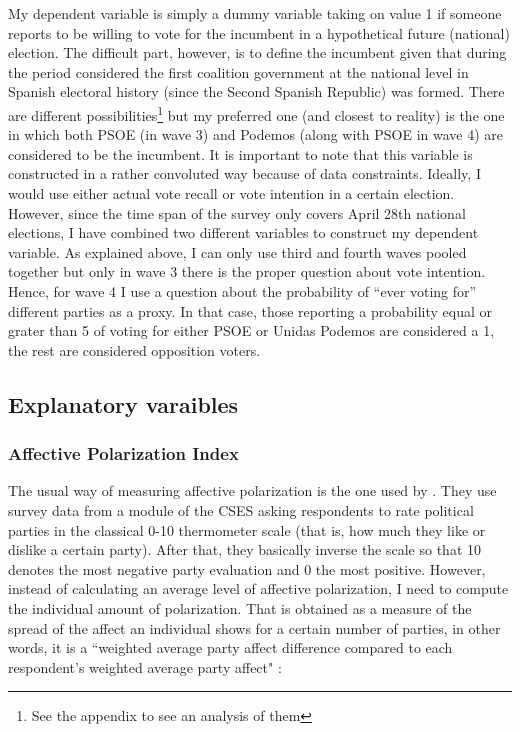 \documentclass[a4paper, svgnames]{article}
\begin{document}
My dependent variable is simply a dummy variable taking on value 1 if someone reports to be willing to vote for the incumbent in a hypothetical future (national) election. The difficult part, however, is to define the incumbent given that during the period considered the first coalition government at the national level in Spanish electoral history (since the Second Spanish Republic) was formed. There are different possibilities\footnote{See the appendix to see an analysis of them} but my preferred one (and closest to reality) is the one in which both PSOE (in wave 3) and Podemos (along with PSOE in wave 4) are considered to be the incumbent. It is important to note that this variable is constructed in a rather convoluted way because of data constraints. Ideally, I would use either actual vote recall or vote intention in a certain election. However, since the time span of the survey only covers April 28th national elections, I have combined two different variables to construct my dependent variable. As explained above, I can only use third and fourth waves pooled together but only in wave 3 there is the proper question about vote intention. Hence, for wave 4 I use a question about the probability of ``ever voting for'' different parties as a proxy. In that case, those reporting a probability equal or grater than 5 of voting for either PSOE or Unidas Podemos are considered a 1, the rest are considered opposition voters.

\subsection{Explanatory varaibles}

\subsubsection{Affective Polarization Index}

The usual way of measuring affective polarization is the one used by \cite{Gidron2018}. They use survey data from a module of the CSES asking respondents to rate political parties in the classical 0-10 thermometer scale (that is, how much they like or dislike a certain party). After that, they basically inverse the scale so that 10 denotes the most negative party evaluation and 0 the most positive. However, instead of calculating an average level of affective polarization, I need to compute the individual amount of polarization. That is obtained as a measure of the spread of the affect an individual shows for a certain number of parties, in other words, it is a ``weighted average party affect difference compared to each respondent's weighted average party affect" \citep{Wagner2021}:
\end{document}

